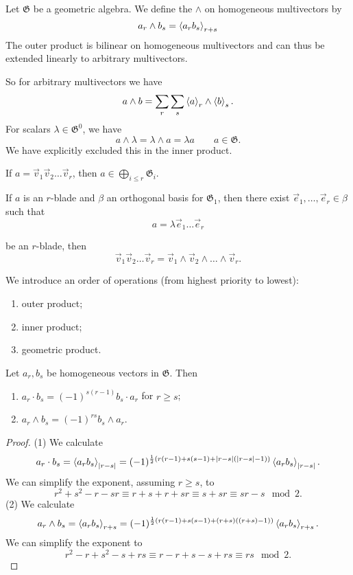 \begin{definition}
Let $\mathfrak{G}$ be a geometric algebra. We define the  $\wedge$ on homogeneous multivectors by
\[ a_r\wedge b_s = \left\langle a_rb_s \right\rangle_{r+s} \]
The outer product is bilinear on homogeneous multivectors and can thus be extended linearly to arbitrary multivectors.
\end{definition}
So for arbitrary multivectors we have
\[ a\wedge b = \sum_r\sum_s \left\langle a \right\rangle_r\wedge \left\langle b \right\rangle_s. \]
For scalars $\lambda \in \mathfrak{G}^0$, we have
\[ a \wedge \lambda = \lambda\wedge a = \lambda a \qquad a \in \mathfrak{G}. \]
We have explicitly excluded this in the inner product.

\begin{lemma}
If $a = \vec{v}_1 \vec{v}_2\ldots \vec{v}_r$, then $a\in \bigoplus_{i\leq r}\mathfrak{G}_i$.

If $a$ is an $r$-blade and $\beta$ an orthogonal basis for $\mathfrak{G}_1$, then there exist $\vec{e}_1,\ldots, \vec{e}_r \in \beta$ such that
\[ a = \lambda \vec{e}_1 \ldots \vec{e}_r \]


 be an $r$-blade, then
\[\vec{v}_1 \vec{v}_2\ldots \vec{v}_r = \vec{v}_1 \wedge \vec{v}_2 \wedge\ldots\wedge \vec{v}_r.\]
\end{lemma}

\begin{note}
We introduce an order of operations (from highest priority to lowest):
\begin{enumerate}
\item outer product;
\item inner product;
\item geometric product.
\end{enumerate}
\end{note}

\begin{lemma}
Let $a_r,b_s$ be homogeneous vectors in $\mathfrak{G}$. Then
\begin{enumerate}
\item $a_r\cdot b_s = (-1)^{s(r-1)}b_s\cdot a_r$ for $r\geq s$;
\item $a_r \wedge b_s = (-1)^{rs}b_s \wedge a_r$.
\end{enumerate}
\end{lemma}
\begin{proof}
(1) We calculate
\[ a_r\cdot b_s = \left\langle a_rb_s \right\rangle_{|r-s|} = (-1)^{\frac{1}{2}(r(r-1) + s(s-1) + |r-s|(|r-s|-1))}\left\langle a_rb_s \right\rangle_{|r-s|}. \]
We can simplify the exponent, assuming $r\geq s$, to
\[ r^2 + s^2 -r -sr \equiv r+s+r+sr \equiv s+sr \equiv sr-s \mod 2.\]
(2) We calculate
\[ a_r \wedge b_s = \left\langle a_rb_s \right\rangle_{r+s} = (-1)^{\frac{1}{2}(r(r-1) + s(s-1) + (r+s)((r+s)-1))}\left\langle a_rb_s \right\rangle_{r+s}. \]
We can simplify the exponent to
\[ r^2 -r+s^2 -s + rs \equiv r-r+s-s+rs \equiv rs \mod 2. \]
\end{proof}

